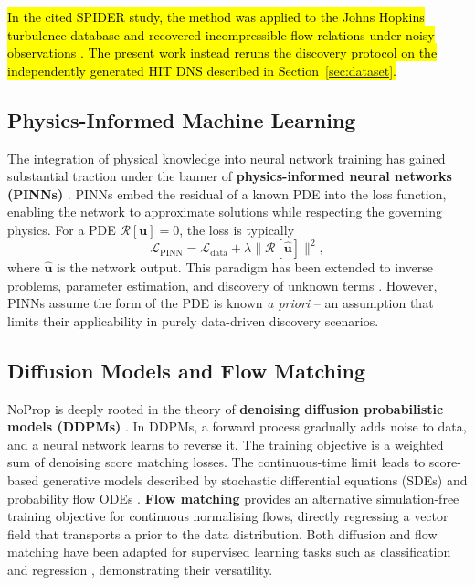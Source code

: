 \documentclass[preprint,12pt]{elsarticle}
\newcommand{\rev}[1]{\hl{#1}}
\begin{document}
\rev{In the cited SPIDER study, the method was applied to the Johns Hopkins turbulence database and recovered incompressible-flow relations under noisy observations \cite{li2008public,gurevich2024learning}. The present work instead reruns the discovery protocol on the independently generated HIT DNS described in Section~\ref{sec:dataset}.}

\subsection{Physics-Informed Machine Learning}
\label{sec:piml}

The integration of physical knowledge into neural network training has gained substantial traction under the banner of \textbf{physics-informed neural networks (PINNs)} \cite{raissi2019physics,karniadakis2021physics}. PINNs embed the residual of a known PDE into the loss function, enabling the network to approximate solutions while respecting the governing physics. For a PDE $\mathcal{R}[\mathbf{u}]=0$, the loss is typically
\begin{equation}
\label{eq:pinn-loss}
\mathcal{L}_{\text{PINN}} = \mathcal{L}_{\text{data}} + \lambda \|\mathcal{R}[\hat{\mathbf{u}}]\|^2,
\end{equation}
where $\hat{\mathbf{u}}$ is the network output. This paradigm has been extended to inverse problems, parameter estimation, and discovery of unknown terms \cite{willard2020integrating,karpatne2017theory}. However, PINNs assume the form of the PDE is known \textit{a priori} -- an assumption that limits their applicability in purely data-driven discovery scenarios.

\subsection{Diffusion Models and Flow Matching}
\label{sec:diffusion}

NoProp is deeply rooted in the theory of \textbf{denoising diffusion probabilistic models (DDPMs)} \cite{sohl2015deep,ho2020denoising,song2021maximum}. In DDPMs, a forward process gradually adds noise to data, and a neural network learns to reverse it. The training objective is a weighted sum of denoising score matching losses. The continuous-time limit leads to score-based generative models described by stochastic differential equations (SDEs) and probability flow ODEs \cite{song2021maximum}. \textbf{Flow matching} \cite{lipman2022flow,tong2023improving} provides an alternative simulation-free training objective for continuous normalising flows, directly regressing a vector field that transports a prior to the data distribution. Both diffusion and flow matching have been adapted for supervised learning tasks such as classification and regression \cite{han2022card,kim2025simulation,hu2024flow}, demonstrating their versatility.
\end{document}
